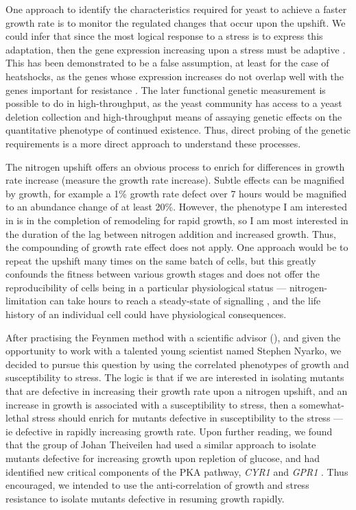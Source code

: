 One approach to identify the characteristics required for yeast to 
achieve a faster growth rate is to monitor the regulated changes that
occur upon the upshift. We could infer
that since the most logical response to a stress is to express this
adaptation, then the gene expression increasing upon a stress must be
adaptive \parencite{gould1979spandrels}. 
This has been demonstrated to be a false assumption, at least for the
case of heatshocks, as the genes whose expression increases do not 
overlap well with the
genes important for resistance \parencite{gibney2013yeast}.
The later functional genetic measurement is possible to do in 
high-throughput, as
the yeast community has access to a yeast deletion collection and
high-throughput means of assaying genetic effects on the quantitative
phenotype of continued existence. 
Thus, direct probing of the genetic requirements is a more direct
approach to understand these processes.

The nitrogen upshift offers an obvious process to enrich for
differences in growth rate increase (measure the growth rate
increase). Subtle effects can be magnified by growth, for example a
1\% growth rate defect over 7 hours would be magnified to an abundance
change of at least 20\%. However, the phenotype I am interested in is
in the completion of remodeling for rapid growth, so I am most
interested in the duration of the lag between nitrogen addition and
increased growth. Thus, the compounding of growth rate effect does not 
apply. One approach would be to repeat the upshift many times on the
same batch of cells, but this greatly confounds the fitness between 
various growth stages and does not offer the reproducibility of cells
being in a particular physiological status --- nitrogen-limitation can
take hours to reach a steady-state of signalling
\parencite{tate2013five}, and the life history of an individual cell
could have physiological consequences.

After practising the Feynmen method with a scientific advisor
(), and given
the opportunity to work with a talented young scientist named Stephen
Nyarko, we decided to pursue this question by using the correlated
phenotypes of growth and susceptibility to stress.
The logic is that if we are interested in isolating mutants that are
defective in increasing their growth rate upon a nitrogen upshift, and
an increase in growth is associated with a susceptibility to stress,
then a somewhat-lethal stress should enrich for mutants defective in
susceptibility to the stress --- ie defective in rapidly increasing 
growth rate.
Upon further reading, we found that the group of Johan Theiveilen had
used a similar approach to isolate mutants defective for increasing
growth upon repletion of glucose, and had identified new critical
components of the PKA pathway, \textit{CYR1} and \textit{GPR1}
\parencite{van2000characterization}.
Thus encouraged, we intended to use the anti-correlation of growth
and stress resistance to isolate mutants defective in resuming growth
rapidly.

